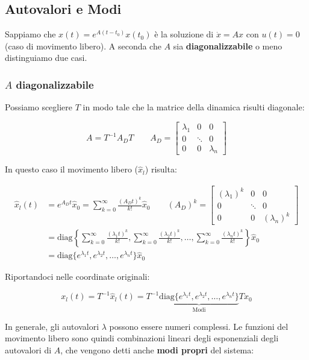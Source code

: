 \documentclass[a4paper,12pt]{article}
\begin{document}
	\subsection{Autovalori e Modi}
	
	Sappiamo che $x(t) = e^{A(t-t_0)}x(t_0)$ è la soluzione di $\dot{x} = Ax$ con $u(t) = 0$ (caso di movimento libero). A seconda che $A$ sia \textbf{diagonalizzabile} o meno distinguiamo due casi.
	
	\subsubsection*{$A$ diagonalizzabile}
	
	Possiamo scegliere $T$ in modo tale che la matrice della dinamica risulti diagonale:
	
	\[
	A = T^{-1} A_D T \qquad 
	A_D = 
	\begin{bmatrix} 
		\lambda_1 & 0 & 0 \\ 
		0 & \ddots & 0 \\ 
		0 & 0 & \lambda_n 
	\end{bmatrix}
	\]
	
	In questo caso il movimento libero ($\hat{x}_l$) risulta:
	
	\[
	\begin{aligned}
		\hat{x}_l(t) &= e^{A_D t}\hat{x}_0 = \sum_{k=0}^{\infty} \frac{(A_D t)^k}{k!} \hat{x}_0 \qquad 
		(A_D)^k = 
		\begin{bmatrix} 
			(\lambda_1)^k & 0 & 0 \\ 
			0 & \ddots & 0 \\ 
			0 & 0 & (\lambda_n)^k 
		\end{bmatrix} 
		\\[10pt]
		&= \text{diag}\left\{ \sum_{k=0}^{\infty} \frac{(\lambda_1 t)^k}{k!}, \sum_{k=0}^{\infty} \frac{(\lambda_2 t)^k}{k!}, \dots, \sum_{k=0}^{\infty} \frac{(\lambda_n t)^k}{k!} \right\} \hat{x}_0 
		\\[10pt]
		&= \text{diag}\{ e^{\lambda_1 t}, e^{\lambda_2 t}, \dots, e^{\lambda_n t} \} \hat{x}_0
	\end{aligned}
	\]
	
	Riportandoci nelle coordinate originali:
	
	\[
	x_l(t) = T^{-1}\hat{x}_l(t) = T^{-1} \underbrace{\text{diag}\{ e^{\lambda_1 t}, e^{\lambda_2 t}, \dots, e^{\lambda_n t} \}}_{\text{Modi}} T x_0
	\]
	
	In generale, gli autovalori $\lambda$ possono essere numeri complessi. Le funzioni del movimento libero sono quindi combinazioni lineari degli esponenziali degli autovalori di $A$, che vengono detti anche \textbf{modi propri} del sistema:
	
\end{document}

